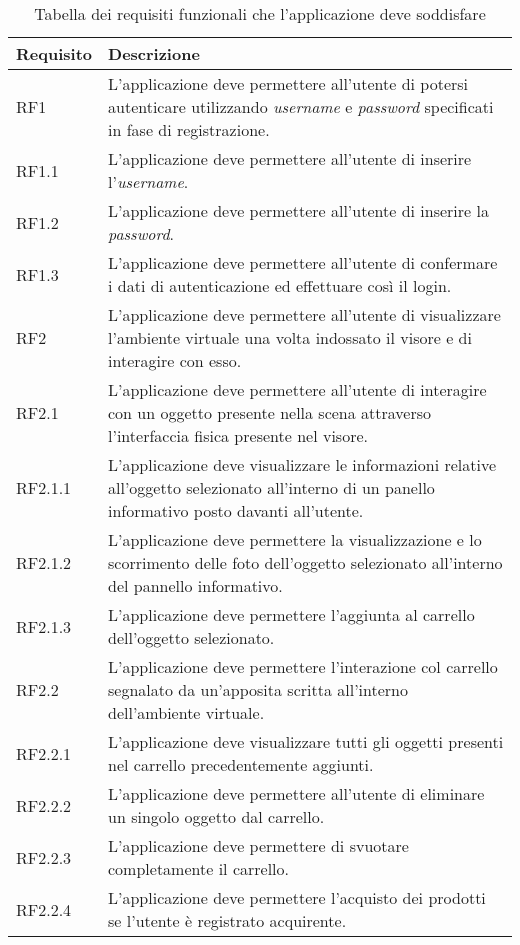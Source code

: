 \begin{table}
	\centering
	\label{tabella-requisiti}
	\begin{tabular}{| l | p{10cm} |}
		\hline
		\textbf{Requisito} & \textbf{Descrizione} \\ \hline
		RF1 & L'applicazione deve permettere all'utente di potersi autenticare utilizzando \textit{username} e \textit{password} specificati in fase di registrazione. \\ \hline
		RF1.1 & L'applicazione deve permettere all'utente di inserire l'\textit{username}. \\ \hline
		RF1.2 & L'applicazione deve permettere all'utente di inserire la \textit{password}. \\ \hline
		RF1.3 & L'applicazione deve permettere all'utente di confermare i dati di autenticazione ed effettuare così il login. \\ \hline
		RF2 & L'applicazione deve permettere all'utente di visualizzare l'ambiente virtuale una volta indossato il visore e di interagire con esso. \\ \hline
		RF2.1 & L'applicazione deve permettere all'utente di interagire con un oggetto presente nella scena attraverso l'interfaccia fisica presente nel visore. \\ \hline
		RF2.1.1 & L'applicazione deve visualizzare le informazioni relative all'oggetto selezionato all'interno di un panello informativo posto davanti all'utente. \\ \hline
		RF2.1.2 & L'applicazione deve permettere la visualizzazione e lo scorrimento delle foto dell'oggetto selezionato all'interno del pannello informativo. \\ \hline
		RF2.1.3 & L'applicazione deve permettere l'aggiunta al carrello dell'oggetto selezionato. \\ \hline
		RF2.2 & L'applicazione deve permettere l'interazione col carrello segnalato da un'apposita scritta all'interno dell'ambiente virtuale. \\ \hline
		RF2.2.1 & L'applicazione deve visualizzare tutti gli oggetti presenti nel carrello precedentemente aggiunti. \\ \hline
		RF2.2.2 & L'applicazione deve permettere all'utente di eliminare un singolo oggetto dal carrello. \\ \hline
		RF2.2.3 & L'applicazione deve permettere di svuotare completamente il carrello. \\ \hline
		RF2.2.4 & L'applicazione deve permettere l'acquisto dei prodotti se l'utente è registrato acquirente. \\ 
		\hline
	\end{tabular}
	\caption{Tabella dei requisiti funzionali che l'applicazione deve soddisfare}
\end{table}
\FloatBarrier

